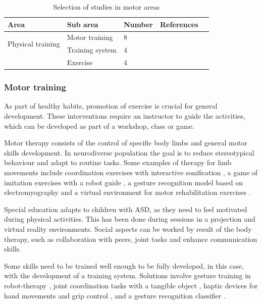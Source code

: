\documentclass[a4paper,fleqn]{cas-sc}
\begin{document}
\begin{table}[h]
\centering
\begin{center}
\begin{tabular*}{6.2in}{p{0.85in}|p{0.82in}|p{0.35in}|p{3.5in}p{0in}}
\hline
Area   & Sub area   & Number & References  &  \\ \hline
\multirow{2}{*}{Physical training}
    & Motor training & 8 & \cite{Soprani22, Hocking22, Cibrian21, Syahputra21, Santos20, Bansode19, Lee18, Cornejo17}  &  \\  \cline{2-4}
    & Training system   & 4   & \cite{Fassina22, Giraud21, Zhao21, Oprea17}  & 
    \\ \cline{2-4}
    & Exercise  & 4   & \cite{Baharin19, MarquezSegura19, Ardalan19, Bittner17}    &  \\\cline{1-4}
\end{tabular*}
\caption{Selection of studies in motor areas}
\label{TABLE:area-motor}
\end{center}
\end{table}

\subsubsection{Motor training}
\label{sec:app-contexts-motor}
As part of healthy habits, promotion of exercise is crucial for general development. These interventions require an instructor to guide the activities, which can be developed as part of a workshop, class or game.

Motor therapy consists of the control of specific body limbs and general motor skills development. In neurodiverse population the goal is to reduce stereotypical behaviour and adapt to routine tasks. Some examples of therapy for limb movements include coordination exercises with interactive sonification \cite{Cibrian21}, a game of imitation exercises with a robot guide \cite{Santos20}, a gesture recognition model based on electromyography \cite{Syahputra21} and a virtual environment for motor rehabilitation exercises \cite{Soprani22}.

Special education adapts to children with ASD, as they need to feel motivated during physical activities. This has been done during sessions in a projection \cite{Cornejo17} and virtual \cite{Hocking22} reality environments.
Social aspects can be worked by result of the body therapy, such as collaboration with peers, joint tasks and enhance communication skills.


Some skills need to be trained well enough to be fully developed, in this case, with the development of a training system. Solutions involve gesture training in robot-therapy \cite{Fassina22}, joint coordination tasks with a tangible object \cite{Giraud21}, haptic devices for hand movements and grip control \cite{Zhao21}, and a gesture recognition classifier \cite{Oprea17}.
\end{document}
